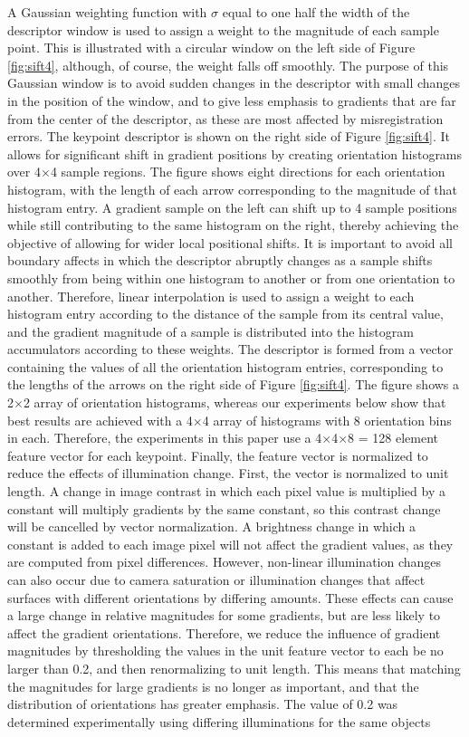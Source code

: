A Gaussian weighting function with $\sigma$ equal to one half the width of the descriptor
window is used to assign a weight to the magnitude of each sample point. This is illustrated
with a circular window on the left side of Figure \ref{fig:sift4}, although, of course, the weight falls off smoothly. The purpose of this Gaussian window is to avoid sudden changes in the
descriptor with small changes in the position of the window, and to give less emphasis
to gradients that are far from the center of the descriptor, as these are most affected by
misregistration errors.
The keypoint descriptor is shown on the right side of Figure \ref{fig:sift4}. It allows for signiﬁcant
shift in gradient positions by creating orientation histograms over 4$\times$4 sample regions. The
ﬁgure shows eight directions for each orientation histogram, with the length of each arrow
corresponding to the magnitude of that histogram entry. A gradient sample on the left can
shift up to 4 sample positions while still contributing to the same histogram on the right,
thereby achieving the objective of allowing for wider local positional shifts.
It is important to avoid all boundary affects in which the descriptor abruptly changes as
a sample shifts smoothly from being within one histogram to another or from one orientation
to another. Therefore, linear interpolation is used to assign a weight to each histogram
entry according to the distance of the sample from its central value, and the gradient magnitude
of a sample is distributed into the histogram accumulators according to these weights.
The descriptor is formed from a vector containing the values of all the orientation histogram
entries, corresponding to the lengths of the arrows on the right side of Figure \ref{fig:sift4}. The
ﬁgure shows a 2$\times$2 array of orientation histograms, whereas our experiments below show
that best results are achieved with a 4$\times$4 array of histograms with 8 orientation bins in each.
Therefore, the experiments in this paper use a 4$\times$4$\times$8 = 128 element feature vector for each
keypoint.
Finally, the feature vector is normalized to reduce the effects of illumination change.
First, the vector is normalized to unit length. A change in image contrast in which each
pixel value is multiplied by a constant will multiply gradients by the same constant, so this
contrast change will be cancelled by vector normalization. A brightness change in which a
constant is added to each image pixel will not affect the gradient values, as they are computed
from pixel differences. However, non-linear illumination changes can also occur due
to camera saturation or illumination changes that affect surfaces with different orientations
by differing amounts. These effects can cause a large change in relative magnitudes for
some gradients, but are less likely to affect the gradient orientations. Therefore, we reduce
the inﬂuence of gradient magnitudes by thresholding the values in the unit feature vector to
each be no larger than 0.2, and then renormalizing to unit length. This means that matching
the magnitudes for large gradients is no longer as important, and that the distribution of
orientations has greater emphasis. The value of 0.2 was determined experimentally using
differing illuminations for the same objects\\

